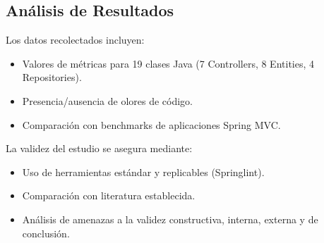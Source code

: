 \subsection{Análisis de Resultados}
Los datos recolectados incluyen:
\begin{itemize}
\item Valores de métricas para 19 clases Java (7 Controllers, 8 Entities, 4 Repositories).
\item Presencia/ausencia de olores de código.
\item Comparación con benchmarks de aplicaciones Spring MVC.
\end{itemize}

La validez del estudio se asegura mediante:
\begin{itemize}
\item Uso de herramientas estándar y replicables (Springlint).
\item Comparación con literatura establecida.
\item Análisis de amenazas a la validez constructiva, interna, externa y de conclusión.
\end{itemize}